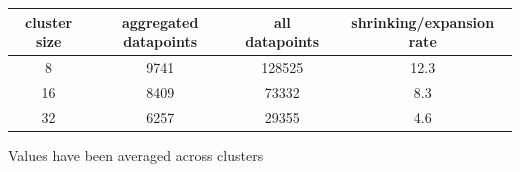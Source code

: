 
\begin{table}[!ht]
		{\begin{tabular}{ | c | c | c | c | } %
			\hline
			{cluster size} & {aggregated datapoints} & {all datapoints} & {shrinking/expansion rate} \\ \hline
			8 &	9741 & 128525 &	12.3 \\ \hline
			16 & 8409 &	73332 &	8.3 \\ \hline
			32 & 6257 &	29355 &	4.6 \\ \hline
		\end{tabular}}
		\begin{tabnote}
			Values have been averaged across clusters
		\end{tabnote}
		\label{tab:models_training_points}
\end{table}

